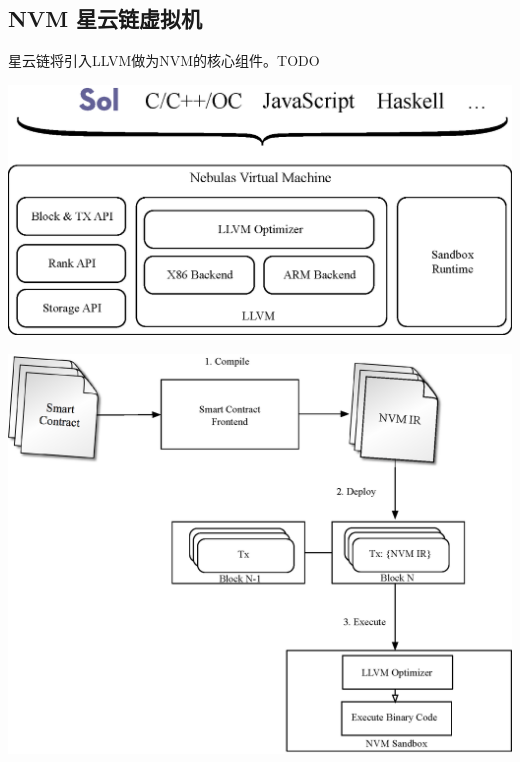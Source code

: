 \subsection{NVM 星云链虚拟机}
\label{sec:nvm}

星云链将引入LLVM做为NVM的核心组件。TODO

\includegraphics[width=14cm]{./figs/nvm}
\label{fig:nvm}

\includegraphics[width=14cm]{./figs/nvm-process}
\label{fig:nvm-process}
